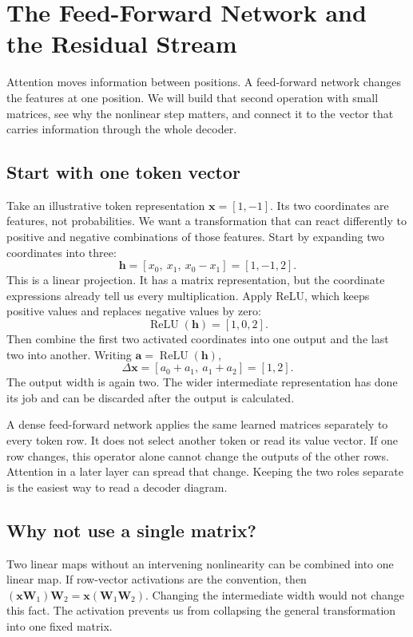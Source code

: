 \chapter{The Feed-Forward Network and the Residual Stream}\label{ch:feed-forward}
\begin{ChapterIntent}
Attention moves information between positions. A feed-forward network
changes the features at one position. We will build that second operation
with small matrices, see why the nonlinear step matters, and connect it
to the vector that carries information through the whole decoder.
\end{ChapterIntent}

\section{Start with one token vector}
Take an illustrative token representation $\mathbf x=[1,-1]$. Its two
coordinates are features, not probabilities. We want a transformation that
can react differently to positive and negative combinations of those
features. Start by expanding two coordinates into three:
\[
 \mathbf h=[x_0,\ x_1,\ x_0-x_1]=[1,-1,2].
\]
This is a linear projection. It has a matrix representation, but the
coordinate expressions already tell us every multiplication. Apply ReLU,
which keeps positive values and replaces negative values by zero:
\[
 \operatorname{ReLU}(\mathbf h)=[1,0,2].
\]
Then combine the first two activated coordinates into one output and the
last two into another. Writing $\mathbf a=\operatorname{ReLU}(\mathbf h)$,
\[
 \Delta\mathbf x=[a_0+a_1,\ a_1+a_2]=[1,2].
\]
The output width is again two. The wider intermediate representation has
done its job and can be discarded after the output is calculated.

A dense feed-forward network applies the same learned matrices separately
to every token row. It does not select another token or read its value
vector. If one row changes, this operator alone cannot change the outputs
of the other rows. Attention in a later layer can spread that change.
Keeping the two roles separate is the easiest way to read a decoder diagram.

\section{Why not use a single matrix?}
Two linear maps without an intervening nonlinearity can be combined into
one linear map. If row-vector activations are the convention, then
$(\mathbf x\mathbf W_1)\mathbf W_2=\mathbf x(\mathbf W_1\mathbf W_2)$.
Changing the intermediate width would not change this fact. The activation
prevents us from collapsing the general transformation into one fixed
matrix.

